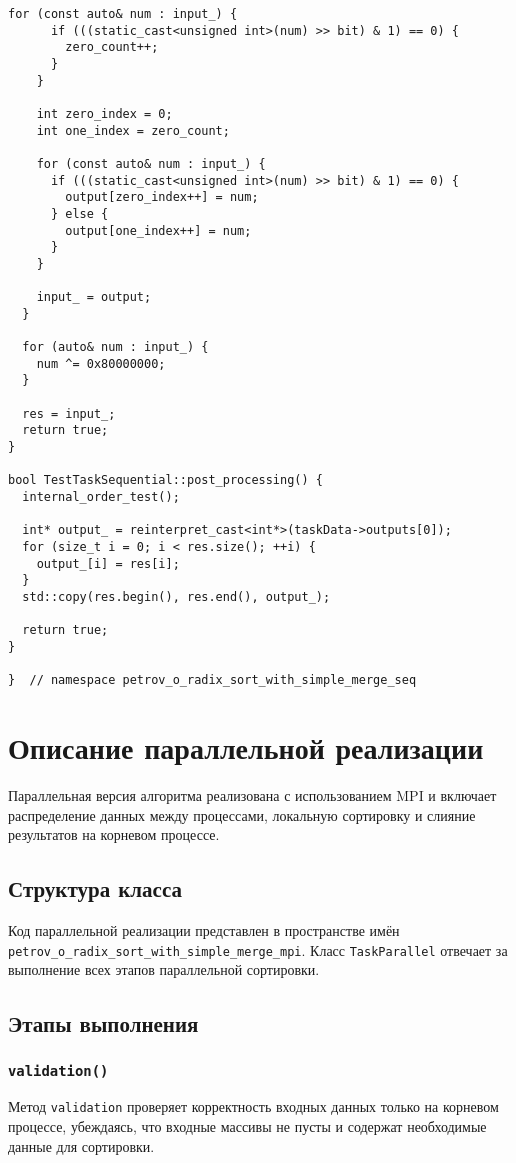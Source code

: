 \documentclass[12pt]{article}
\begin{document}
\begin{lstlisting}[caption={Последовательная версия поразрядной сортировки}]
    for (const auto& num : input_) {
      if (((static_cast<unsigned int>(num) >> bit) & 1) == 0) {
        zero_count++;
      }
    }

    int zero_index = 0;
    int one_index = zero_count;

    for (const auto& num : input_) {
      if (((static_cast<unsigned int>(num) >> bit) & 1) == 0) {
        output[zero_index++] = num;
      } else {
        output[one_index++] = num;
      }
    }

    input_ = output;
  }

  for (auto& num : input_) {
    num ^= 0x80000000;
  }

  res = input_;
  return true;
}

bool TestTaskSequential::post_processing() {
  internal_order_test();

  int* output_ = reinterpret_cast<int*>(taskData->outputs[0]);
  for (size_t i = 0; i < res.size(); ++i) {
    output_[i] = res[i];
  }
  std::copy(res.begin(), res.end(), output_);

  return true;
}

}  // namespace petrov_o_radix_sort_with_simple_merge_seq
\end{lstlisting}


\section{Описание параллельной реализации}

Параллельная версия алгоритма реализована с использованием MPI и включает распределение данных между процессами, локальную сортировку и слияние результатов на корневом процессе.

\subsection{Структура класса}

Код параллельной реализации представлен в пространстве имён \texttt{petrov\_o\_radix\_sort\_with\_simple\_merge\_mpi}. Класс \texttt{TaskParallel} отвечает за выполнение всех этапов параллельной сортировки.

\subsection{Этапы выполнения}

\subsubsection{\texttt{validation()}}
Метод \texttt{validation} проверяет корректность входных данных только на корневом процессе, убеждаясь, что входные массивы не пусты и содержат необходимые данные для сортировки.
\end{document}
